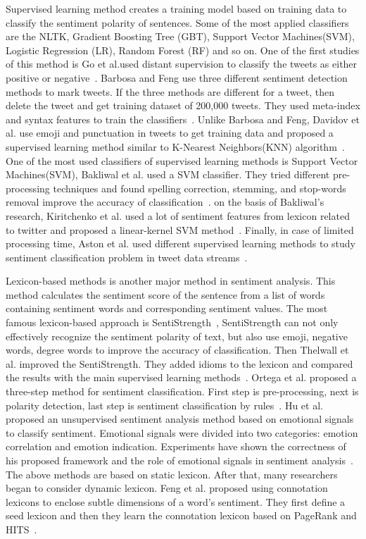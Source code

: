 \documentclass[runningheads]{llncs}
\begin{document}
Supervised learning method creates a training model based on training data to classify the sentiment polarity of sentences. Some of the most applied classifiers are the NLTK, Gradient Boosting Tree (GBT), Support
Vector Machines(SVM), Logistic Regression (LR), Random Forest (RF) and so on. One of the first studies of this method is Go et al.used distant supervision to classify the tweets as either positive or negative~\cite{Go2009Supervisedlearning}. Barbosa and Feng use three different sentiment detection methods to mark tweets. If the three methods are different for a tweet, then delete the tweet and get training dataset of 200,000 tweets. They used meta-index and syntax features to train the classifiers~\cite{Barbosa2010Supervisedlearning}. Unlike Barbosa and Feng, Davidov et al. use emoji and punctuation in tweets to get training data and proposed a supervised learning method similar to  K-Nearest Neighbors(KNN) algorithm~\cite{Davidov2010Supervisedlearning}. One of the most used classifiers of supervised learning methods is Support Vector Machines(SVM), Bakliwal et al. used a SVM classifier. They tried different pre-processing techniques and found spelling correction, stemming, and stop-words removal improve the accuracy of classification~\cite{Bakliwal2012Supervisedlearning}. on the basis of Bakliwal's research, Kiritchenko et al. used a lot of sentiment features from lexicon related to twitter and proposed a linear-kernel SVM method~\cite{Kiritchenko2014Supervisedlearning}. Finally, in case of limited processing time, Aston et al. used different supervised learning methods to study sentiment classification problem in tweet data streams~\cite{Aston2014Supervisedlearning}.

Lexicon-based methods is another major method in sentiment analysis. This method calculates the sentiment score of the sentence from a list of words containing sentiment words and corresponding sentiment values. The most famous lexicon-based approach is SentiStrength~\cite{sentistrength2010}, SentiStrength can not only effectively recognize the sentiment polarity of text, but also use emoji, negative words, degree words to improve the accuracy of classification. Then Thelwall et al. improved the SentiStrength. They added idioms to the lexicon and compared the results with the main supervised learning methods~\cite{Thelwall2012lexicon}. Ortega et al. proposed a three-step method for sentiment classification. First step is pre-processing, next is polarity detection, last step is sentiment classification by rules~\cite{Ortega2013lexicon}. Hu et al. proposed an unsupervised sentiment analysis method based on emotional signals to classify sentiment. Emotional signals were divided into two categories: emotion correlation and emotion indication. Experiments have shown the correctness of his proposed framework and the role of emotional signals in sentiment analysis~\cite{Hu2013lexicon}. The above methods are based on static lexicon. After that, many researchers began to consider dynamic lexicon.  Feng et al. proposed using connotation lexicons to enclose subtle dimensions of a word’s sentiment. They first define a seed lexicon and then they learn the connotation lexicon based on PageRank and HITS~\cite{Feng2011lexicon}.
\end{document}
